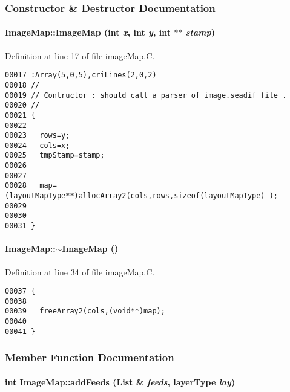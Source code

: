 \subsubsection{Constructor \& Destructor Documentation}
\label{ImageMap_a0}
\paragraph{\setlength{\rightskip}{0pt plus 5cm}Image\-Map::Image\-Map (int {\em x}, int {\em y}, int $\ast$$\ast$ {\em stamp})}\hfill



Definition at line 17 of file image\-Map.C.\small\begin{verbatim}00017 :Array(5,0,5),criLines(2,0,2)
00018 //
00019 // Contructor : should call a parser of image.seadif file .
00020 //
00021 {
00022 
00023   rows=y;
00024   cols=x;
00025   tmpStamp=stamp;
00026 
00027   
00028   map=(layoutMapType**)allocArray2(cols,rows,sizeof(layoutMapType) );
00029 
00030 
00031 }
\end{verbatim}\normalsize 
\label{ImageMap_a1}
\paragraph{\setlength{\rightskip}{0pt plus 5cm}Image\-Map::$\sim$Image\-Map ()}\hfill



Definition at line 34 of file image\-Map.C.\small\begin{verbatim}00037 {
00038 
00039   freeArray2(cols,(void**)map);
00040 
00041 }
\end{verbatim}\normalsize 


\subsubsection{Member Function Documentation}
\label{ImageMap_a4}
\paragraph{\setlength{\rightskip}{0pt plus 5cm}int Image\-Map::add\-Feeds ({\bf List} \& {\em feeds}, {\bf layer\-Type} {\em lay})}\hfill



